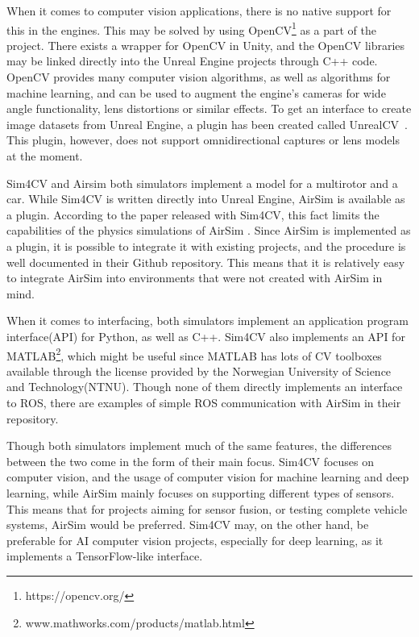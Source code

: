 When it comes to computer vision applications, there is no native support for this in the engines. This may be solved by using OpenCV\footnote{https://opencv.org/} as a part of the project. There exists a wrapper for OpenCV in Unity, and the OpenCV libraries may be linked directly into the Unreal Engine projects through C++ code. OpenCV provides many computer vision algorithms, as well as algorithms for machine learning, and can be used to augment the engine's cameras for wide angle functionality, lens distortions or similar effects. To get an interface to create image datasets from Unreal Engine, a plugin has been created called UnrealCV~\cite{UnrealCV}. This plugin, however, does not support omnidirectional captures or lens models at the moment.

Sim4CV and Airsim both simulators implement a model for a multirotor and a car. While Sim4CV is written directly into Unreal Engine, AirSim is available as a plugin. According to the paper released with Sim4CV, this fact limits the capabilities of the physics simulations of AirSim \cite{Sim4CV_paper}. Since AirSim is implemented as a plugin, it is possible to integrate it with existing projects, and the procedure is well documented in their Github repository. This means that it is relatively easy to integrate AirSim into environments that were not created with AirSim in mind. 

When it comes to interfacing, both simulators implement an application program interface(API) for Python, as well as C++. Sim4CV also implements an API for MATLAB\footnote{www.mathworks.com/products/matlab.html}, which might be useful since MATLAB has lots of CV toolboxes available through the license provided by the Norwegian University of Science and Technology(NTNU). Though none of them directly implements an interface to ROS, there are examples of simple ROS communication with AirSim in their repository.

Though both simulators implement much of the same features, the differences between the two come in the form of their main focus. Sim4CV focuses on computer vision, and the usage of computer vision for machine learning and deep learning, while AirSim mainly focuses on supporting different types of sensors. This means that for projects aiming for sensor fusion, or testing complete vehicle systems, AirSim would be preferred. Sim4CV may, on the other hand, be preferable for AI computer vision projects, especially for deep learning, as it implements a TensorFlow-like interface.

